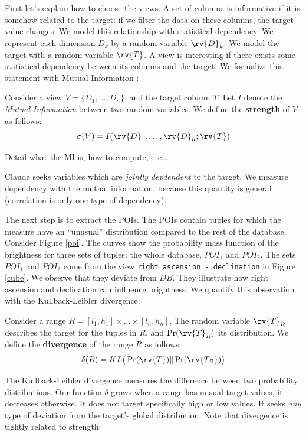 First let's explain how to choose the views. A set of columns is informative if
it is somehow related to the target: if we filter the data on these columns,
the target value changes.  We model this relationship with statistical
dependency. We represent each  dimension $D_k$ by a random variable $\rv{D}_k$.
We model the target with a random variable $\rv{T}$.  A view is interesting if
there exists some statistical dependency between its columns and the target. We
formalize this statement with Mutual Information \cite{cover2012elements}:

\begin{definition}
Consider a view $V = \{D_1, \ldots, D_n\}$, and the target column $T$.  Let
$I$ denote the \emph{Mutual Information} between two random variables. We
define the \textbf{strength} of $V$ as follows:
\[\sigma(V) = I(\rv{D}_1, \ldots, \rv{D}_n ; \rv{T})\]
\end{definition}

{\color{red}
Detail what the MI is, how to compute, etc...
}

Claude seeks variables which are \emph{jointly depdendent} to the target. We
measure dependency with the mutual information, because this quantity is
general (correlation is only one type of dependency).

The next step is to extract the POIs. The POIs contain tuples for which the
measure have an ``unusual'' distribution compared to the rest of the database.
Consider Figure \ref{poi}. The curves show the probability mass function of the
brightness for three sets of tuples: the whole database, $POI_1$ and $POI_2$.
The sets $POI_1$ and $POI_2$ come from the view \texttt{right ascension -
declination} in Figure \ref{cube}. We observe that they deviate from $DB$.
They illustrate how right ascension and declination can influence brightness.
We quantify this observation with the Kullback-Leibler divergence:

\begin{definition}
Consider a range $R = [l_1, h_1] \times \ldots \times [l_n, h_n]$. 
The random variable $\rv{T}_R$ describes the target for
the tuples in $R$, and $\Pr(\rv{T}_R)$ its distribution.
We define the \textbf{divergence} of the range $R$ as follows: 
\[\delta(R) = KL \big( \Pr(\rv{T}) \| \Pr(\rv{T_R})  \big)\]
\end{definition}

The Kullback-Leibler divergence measures the difference between two probability
distributions. Our function $\delta$ grows when a range has unsual target
values, it decreases otherwise. It does not target specifically high or low
values. It seeks \emph{any} type of deviation from the target's global
distribution.  Note that divergence is tightly related to strength:

